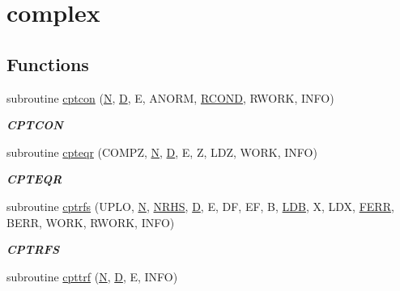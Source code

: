 \hypertarget{group__complexPTcomputational}{}\section{complex}
\label{group__complexPTcomputational}
\subsection*{Functions}
\begin{DoxyCompactItemize}
\item 
subroutine \hyperlink{group__complexPTcomputational_ga4e9b4c5682a455e0c1a60ca3166a050c}{cptcon} (\hyperlink{polmisc_8c_a0240ac851181b84ac374872dc5434ee4}{N}, \hyperlink{odrpack_8h_a7dae6ea403d00f3687f24a874e67d139}{D}, E, A\+N\+O\+R\+M, \hyperlink{superlu__enum__consts_8h_af00a42ecad444bbda75cde1b64bd7e72a9b5c151728d8512307565994c89919d5}{R\+C\+O\+N\+D}, R\+W\+O\+R\+K, I\+N\+F\+O)
\begin{DoxyCompactList}\small\item\em {\bfseries C\+P\+T\+C\+O\+N} \end{DoxyCompactList}\item 
subroutine \hyperlink{group__complexPTcomputational_ga0333b0f77b9e0af4ad1012b14d9d9d22}{cpteqr} (C\+O\+M\+P\+Z, \hyperlink{polmisc_8c_a0240ac851181b84ac374872dc5434ee4}{N}, \hyperlink{odrpack_8h_a7dae6ea403d00f3687f24a874e67d139}{D}, E, Z, L\+D\+Z, W\+O\+R\+K, I\+N\+F\+O)
\begin{DoxyCompactList}\small\item\em {\bfseries C\+P\+T\+E\+Q\+R} \end{DoxyCompactList}\item 
subroutine \hyperlink{group__complexPTcomputational_ga2d92211a4a19cad8b7c36d9aa1602069}{cptrfs} (U\+P\+L\+O, \hyperlink{polmisc_8c_a0240ac851181b84ac374872dc5434ee4}{N}, \hyperlink{example__user_8c_aa0138da002ce2a90360df2f521eb3198}{N\+R\+H\+S}, \hyperlink{odrpack_8h_a7dae6ea403d00f3687f24a874e67d139}{D}, E, D\+F, E\+F, B, \hyperlink{example__user_8c_a50e90a7104df172b5a89a06c47fcca04}{L\+D\+B}, X, L\+D\+X, \hyperlink{superlu__enum__consts_8h_af00a42ecad444bbda75cde1b64bd7e72a78fd14d7abebae04095cfbe02928f153}{F\+E\+R\+R}, B\+E\+R\+R, W\+O\+R\+K, R\+W\+O\+R\+K, I\+N\+F\+O)
\begin{DoxyCompactList}\small\item\em {\bfseries C\+P\+T\+R\+F\+S} \end{DoxyCompactList}\item 
subroutine \hyperlink{group__complexPTcomputational_gab4ab4f156ac9e5e7e67f4c45b6033ba6}{cpttrf} (\hyperlink{polmisc_8c_a0240ac851181b84ac374872dc5434ee4}{N}, \hyperlink{odrpack_8h_a7dae6ea403d00f3687f24a874e67d139}{D}, E, I\+N\+F\+O)

\end{DoxyCompactItemize}
